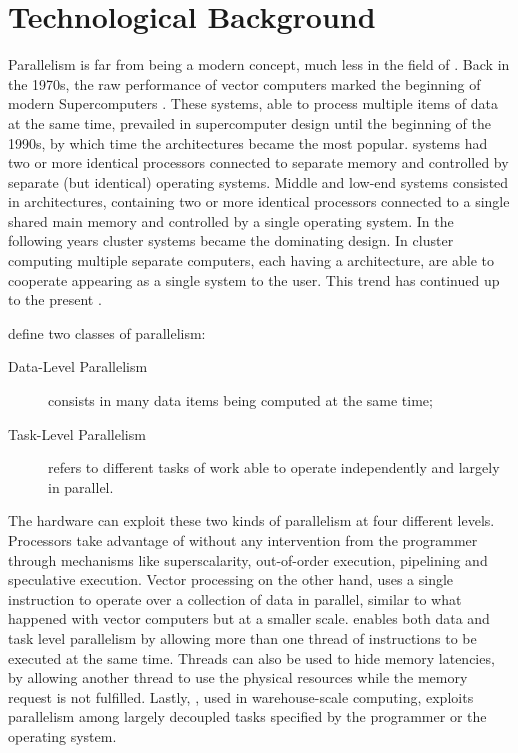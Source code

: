 \documentclass[../thesis]{subfiles}
\begin{document}
	\chapter{Technological Background}
	\label{chp:techbg}

	Parallelism is far from being a modern concept, much less in the field of \hpc. Back in the 1970s, the raw performance of vector computers marked the beginning of modern Supercomputers \cite{Strohmaier:2005:20years}. These systems, able to process multiple items of data at the same time, prevailed in supercomputer design until the beginning of the 1990s, by which time the \mpp architectures became the most popular. \mpp systems had two or more identical processors connected to separate memory and controlled by separate (but identical) operating systems. Middle and low-end systems consisted in \smp architectures, containing two or more identical processors connected to a single shared main memory and controlled by a single operating system. In the following years cluster systems became the dominating design. In cluster computing multiple separate computers, each having a \smp architecture, are able to cooperate appearing as a single system to the user. This trend has continued up to the present \cite{TheNextWave:1:2013:Supercomputers,TOP500:overtime}.

	 define two classes of parallelism:
		\begin{description}
			\item [Data-Level Parallelism] consists in many data items being computed at the same time;
			\item [Task-Level Parallelism] refers to different tasks of work able to operate independently and largely in parallel.
		\end{description}
	 The hardware can exploit these two kinds of parallelism at four different levels. Processors take advantage of \ilp without any intervention from the programmer through mechanisms like superscalarity, out-of-order execution, pipelining and speculative execution. Vector processing on the other hand, uses a single instruction to operate over a collection of data in parallel, similar to what happened with vector computers but at a smaller scale. \tlp enables both data and task level parallelism by allowing more than one thread of instructions to be executed at the same time. Threads can also be used to hide memory latencies, by allowing another thread to use the physical resources while the memory request is not fulfilled. Lastly, \rlp, used in warehouse-scale computing, exploits parallelism among largely decoupled tasks specified by the programmer or the operating system.
\end{document}
